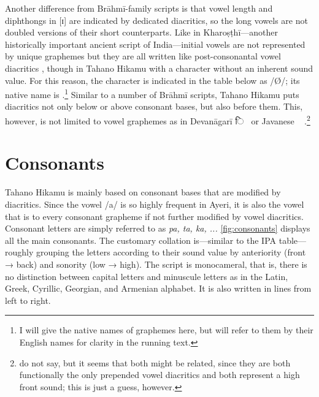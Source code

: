 Another difference from Brāhmī-family scripts is that vowel length and
diphthongs in [ɪ] are indicated by dedicated diacritics, so the long vowels are
not doubled versions of their short counterparts. Like in Kharoṣṭhī---another
historically important ancient script of India---initial vowels are not
represented by unique graphemes but they are all written like post-consonantal
vowel diacritics \citep[377]{salomon1996}, though in Tahano Hikamu with a
character without an inherent sound value. For this reason, the character is
indicated in the table below as  /Ø/; its native name is
.\footnote{I will give the native names of
graphemes here, but will refer to them by their English names for clarity in
the running text.} Similar to a number of Brāhmī scripts, Tahano Hikamu puts
diacritics not only below or above consonant bases, but also before them. This,
however, is not limited to vowel graphemes as in Devanāgarī {\FS ि}~ or
Javanese ~
\citep[478]{kuipersmcdermott1996}.\footnote{\citet{kuipersmcdermott1996} do not
say, but it seems that both might be related, since they are both functionally
the only prepended vowel diacritics and both represent a high front sound; this
is just a guess, however.}

\section{Consonants}

Tahano Hikamu is mainly based on consonant bases that are modified by
diacritics. Since the vowel /a/ is so highly frequent in Ayeri, it is also the
vowel that is  to every consonant grapheme if not further modified
by vowel diacritics. Consonant letters are simply referred to as \textit{pa,
ta, ka, ...} \autoref{fig:consonants} displays all the main consonants. The
customary collation is---similar to the IPA table---roughly grouping the
letters according to their sound value by anteriority (front → back) and
sonority (low → high). The script is monocameral, that is, there is no
distinction between capital letters and minuscule letters as in the Latin,
Greek, Cyrillic, Georgian, and Armenian alphabet. It is also written in lines
from left to right.


